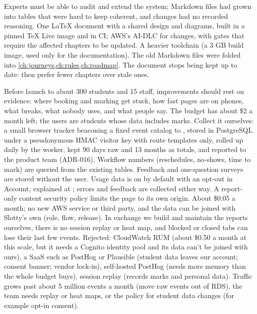   {Experts must be able to audit and extend the system; Markdown files had grown into tables that
   were hard to keep coherent, and changes had no recorded reasoning.}
  {One LaTeX document with a shared design and diagrams, built in a pinned TeX Live image and in
   CI; AWS's AI-DLC for changes, with gates that require the affected chapters to be updated.}
  {A heavier toolchain (a 3 GB build image, used only for the documentation). The old Markdown
   files were folded into \cref{ch:journeys,ch:rules,ch:roadmap}.}
  {The document stops being kept up to date: then prefer fewer chapters over stale ones.}

  {Before launch to about 300 students and 15 staff, improvements should rest on evidence: where
   booking and marking get stuck, how fast pages are on phones, what breaks, what nobody uses, and
   what people say. The budget has about \$2 a month left; the users are students whose data
   includes marks.}
  {Collect it ourselves: a small browser tracker beaconing a fixed event catalog to
   , stored in PostgreSQL under a pseudonymous HMAC visitor key with route
   templates only, rolled up daily by the worker, kept 90 days raw and 13 months as totals, and
   reported to the product team (ADR-016). Workflow numbers (reschedules, no-shows, time to mark) are
   queried from the existing tables. Feedback and one-question surveys are stored without the
   user. Usage data is on by default with an opt-out in Account, explained at ;
   errors and feedback are collected either way. A report-only content security policy limits
   the page to its own origin.}
  {About \$0.05 a month; no new AWS service or third party, and the data can be joined with
   Slotty's own (role, flow, release). In exchange we build and maintain the reports ourselves,
   there is no session replay or heat map, and blocked or closed tabs can lose their last few
   events. Rejected: CloudWatch RUM (about \$0.50 a month at this scale, but it needs a Cognito
   identity pool and its data can't be joined with ours), a SaaS such as PostHog or Plausible
   (student data leaves our account; consent banner; vendor lock-in), self-hosted PostHog (needs
   more memory than the whole budget buys), session replay (records marks and personal data).}
  {Traffic grows past about 5 million events a month (move raw events out of RDS), the team
   needs replay or heat maps, or the policy for student data changes (for example opt-in
   consent).}

